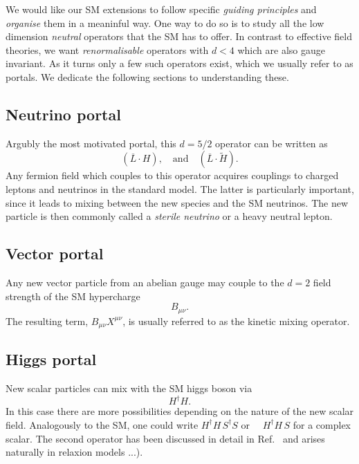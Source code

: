 We would like our SM extensions to follow specific \emph{guiding principles} and \emph{organise} them in a meaninful way. One way to do so is to study all the low dimension \emph{neutral} operators that the SM has to offer. In contrast to effective field theories, we want \emph{renormalisable} operators with $d<4$ which are also gauge invariant. As it turns only a few such operators exist, which we usually refer to as portals. We dedicate the following sections to understanding these.

\subsection{Neutrino portal} 

Argubly the most motivated portal, this $d=5/2$ operator can be written as
\begin{equation}
 \left( \overline{L} \cdot H\right), \quad \mathrm{and}\quad \left( \overline{L} \cdot \tilde{H}\right).
\end{equation}
Any fermion field which couples to this operator acquires couplings to charged leptons and neutrinos in the standard model. The latter is particularly important, since it leads to mixing between the new species and the SM neutrinos. The new particle is then commonly called a \emph{sterile neutrino} or a heavy neutral lepton.

\subsection{Vector portal}

Any new vector particle from an abelian gauge may couple to the $d=2$ field strength of the SM hypercharge
\begin{equation}
B_{\mu\nu}.
\end{equation}
The resulting term, $B_{\mu\nu} X^{\mu\nu}$, is usually referred to as the kinetic mixing operator.

\subsection{Higgs portal}

New scalar particles can mix with the SM higgs boson via 
\begin{equation}
 H^\dagger H.
\end{equation}
In this case there are more possibilities depending on the nature of the new scalar field. Analogously to the SM, one could write  $H^\dagger H \, S^\dagger S$ or $\quad H^\dagger H\, S $ for a complex scalar. The second operator has been discussed in detail in Ref.~\cite{Fradette:2018hhl} and arises naturally in relaxion models ...).

